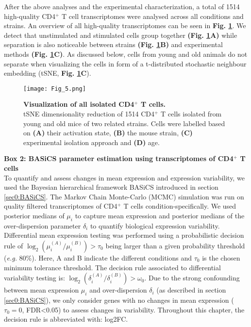 \captionsetup[figure]{list=yes}

After the above analyses and the experimental characterization, a total of 1514 high-quality CD4$^+$ T cell transcriptomes were analysed across all conditions and strains. An overview of all high-quality transcriptomes can be seen in \textbf{Fig. \ref{fig1:all_cells}}. We detect that unstimulated and stimulated cells group together \textbf{(Fig. \ref{fig1:all_cells}A)} while separation is also noticeable between strains \textbf{(Fig. \ref{fig1:all_cells}B)} and experimental methods \textbf{(Fig. \ref{fig1:all_cells}C)}. As discussed below, cells from young and old animals do not separate when visualizing the cells in form of a t-distributed stochastic neighbour embedding (tSNE, \textbf{Fig. \ref{fig1:all_cells}C}). 

\newpage

\begin{figure}[!hb]
\centering
\texttt{[image: Fig\_5.png]}
\caption[Visualization of all isolated CD4$^+$ T cells]{\textbf{Visualization of all isolated CD4$^+$ T cells.}\\
tSNE dimensionality reduction of 1514 CD4$^+$ T cells isolated from young and old mice of two related strains. Cells were labelled based on \textbf{(A)} their activation state, \textbf{(B)} the mouse strain, \textbf{(C)} experimental isolation approach and \textbf{(D)} age.}
\label{fig1:all_cells}
\end{figure}

\begin{Comment}
\textbf{Box 2: BASiCS parameter estimation using transcriptomes of CD4$^+$ T cells}\\
To quantify and assess changes in mean expression and expression variability, we used the Bayesian hierarchical framework BASiCS introduced in section \ref{sec0:BASiCS}. The Markov Chain Monte-Carlo (MCMC) simulation was run on quality filtered transcriptomes of CD4$^+$ T cells condition-specifically. We used posterior medians of $\mu_i$ to capture mean expression and posterior medians of the over-dispersion parameter $\delta_i$ to quantify biological expression variability. Differential mean expression testing was performed using a probabilistic decision rule of $\log_2(\mu_i^{(A)}/\mu_i^{(B)})>\tau_0$ being larger than a given probability threshold (\emph{e.g.} 80\%). Here, A and B indicate the different conditions and $\tau_0$ is the chosen minimum tolerance threshold. The decision rule associated to differential variability testing is: $\log_2(\delta_i^{(A)}/\delta_i^{(B)})>\omega_0$. Due to the strong confounding between mean expression $\mu_i$ and over-dispersion $\delta_i$ (as described in section \ref{sec0:BASiCS}), we only consider genes with no changes in mean expression ($\tau_0=0$, FDR<0.05) to assess changes in variability. Throughout this chapter, the decision rule is abbreviated with: log2FC. 
\end{Comment}

